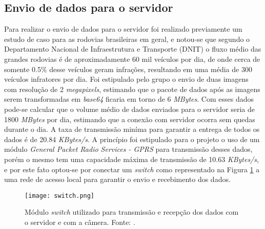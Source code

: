     \subsection{Envio de dados para o servidor}
    Para realizar o envio de dados para o servidor foi realizado previamente um estudo de caso para as rodovias brasileiras em geral, e notou-se que segundo o Departamento Nacional de Infraestrutura e Transporte (DNIT) \cite{DNIT} o fluxo médio das grandes rodovias é de aproximadamente 60 mil veículos por dia, de onde cerca de somente 0.5\% desse veículos geram infrações, resultando em uma média de 300 veículos infratores por dia. Foi estipulado pelo grupo o envio de duas imagens com resolução de 2 \emph{megapixels}, estimando que o pacote de dados após as imagens serem transformadas em \emph{base64} ficaria em torno de 6 \emph{MBytes}. Com esses dados pode-se calcular que o volume médio de dados enviados para o servidor seria de 1800 \emph{MBytes} por dia, estimando que a conexão com servidor ocorra sem quedas durante o dia. A taxa de transmissão miníma para garantir a entrega de todos os dados é de 20.84 \emph{KBytes/s}. A princípio foi estipulado para o projeto o uso de um módulo \emph{General Packet Radio Services - GPRS} para transmissão desses dados, porém o mesmo tem uma capacidade máxima de transmissão de 10.63 \emph{KBytes/s}, e por este fato optou-se por conectar um \emph{switch}  como representado na Figura \ref{switch} a uma rede de acesso local para garantir o envio e recebimento dos dados. 
        \begin{figure}[H]
            \centering
            \texttt{[image: switch.png]}
            \caption{Módulo \emph{switch} utilizado para transmissão e recepção dos dados com o servidor e com a câmera. Fonte: \cite{switch}.}
            \label{switch}
        \end{figure}
